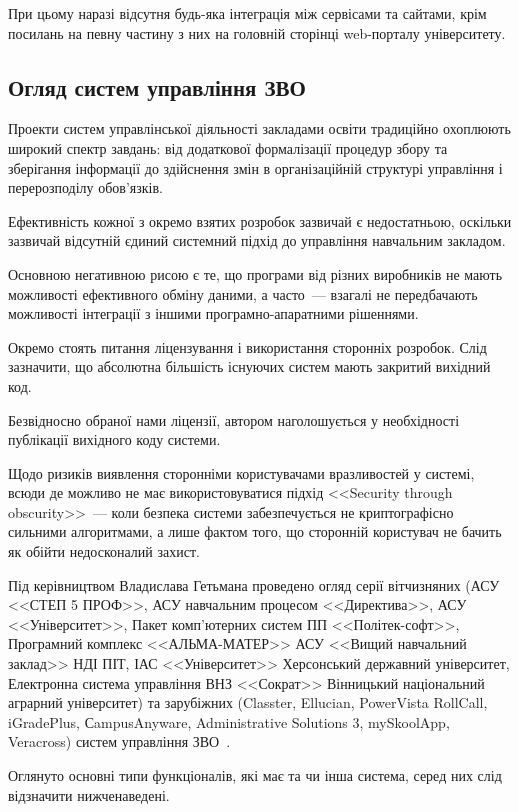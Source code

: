 При цьому наразі відсутня будь-яка інтеграція між сервісами та сайтами, крім посилань на певну частину з них на головній сторінці web-порталу університету.

\subsection{Огляд систем управління ЗВО}

Проекти систем управлінської діяльності закладами освіти традиційно охоплюють широкий спектр завдань: від додаткової формалізації процедур збору та зберігання інформації до здійснення змін в організаційній структурі управління і перерозподілу обов’язків.

Ефективність кожної з окремо взятих розробок зазвичай є недостатньою, оскільки зазвичай відсутній єдиний системний підхід до управління навчальним закладом. 

Основною негативною рисою є те, що програми від різних виробників не мають можливості ефективного обміну даними, а часто~--- взагалі не передбачають можливості інтеграції з іншими програмно-апаратними рішеннями.

Окремо стоять питання ліцензування і використання сторонніх розробок. Слід зазначити, що абсолютна більшість існуючих систем мають закритий вихідний код. 

Безвідносно обраної нами ліцензії, автором наголошується у необхідності публікації вихідного коду системи.

Щодо ризиків виявлення сторонніми користувачами вразливостей у системі, всюди де можливо не має використовуватися підхід <<Security through obscurity>>~--- коли безпека системи забезпечується не криптографісно сильними алгоритмами, а лише фактом того, що сторонній користувач не бачить як обійти недосконалий захист.

Під керівництвом Владислава Гетьмана проведено огляд серії вітчизняних (АСУ <<СТЕП 5 ПРОФ>>, АСУ навчальним процесом <<Директива>>, АСУ <<Університет>>, Пакет комп’ютерних систем ПП <<Політек-софт>>, Програмний комплекс <<АЛЬМА-МАТЕР>> АСУ <<Вищий навчальний заклад>> НДІ ПІТ, ІАС <<Університет>> Херсонський державний університет, Електронна система управління ВНЗ <<Сократ>> Вінницький національний аграрний університет) та зарубіжних (Classter, Ellucian, PowerVista RollCall, iGradePlus, СampusAnyware, Administrative Solutions 3, mySkoolApp, Veracross) систем управління ЗВО~\cite{гетьман2020}.

Оглянуто основні типи функціоналів, які має та чи інша система, серед них слід відзначити нижченаведені.

